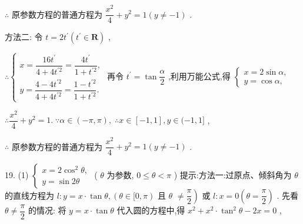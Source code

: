 $\therefore$ 原参数方程的普通方程为 $\dfrac{{x}^{2}}{4} + {y}^{2} = 1\left( {y \neq   - 1}\right)$ .

方法二: 令 $t = 2{t}^{\prime }\left( {{t}^{\prime } \in  \mathbf{R}}\right)$ ,

$\therefore \left\{  \begin{array}{l} x = \dfrac{{16}{t}^{\prime }}{4 + 4{t}^{\prime 2}} = \dfrac{4{t}^{\prime }}{1 + {t}^{\prime 2}}, \\  y = \dfrac{4 - 4{t}^{\prime 2}}{4 + 4{t}^{\prime 2}} = \dfrac{1 - {t}^{\prime 2}}{1 + {t}^{\prime 2}}. \end{array}\right.$ 再令 ${t}^{\prime } = \tan \dfrac{\alpha }{2}$ ,利用万能公式,得 $\left\{  \begin{array}{l} x = 2\sin \alpha , \\  y = \cos \alpha , \end{array}\right.$

$\therefore \dfrac{{x}^{2}}{4} + {y}^{2} = 1.\;\because \alpha  \in  \left( {-\pi ,\pi }\right) ,\;\therefore x \in  \left\lbrack  {-1,1}\right\rbrack  ,y \in  ( - 1,1\rbrack$ ,

$\therefore$ 原参数方程的普通方程为 $\dfrac{{x}^{2}}{4} + {y}^{2} = 1\left( {y \neq   - 1}\right)$ .

19. (1) $\left\{  \begin{array}{l} x = 2{\cos }^{2}\theta , \\  y = \sin {2\theta } \end{array}\right.$ ( $\theta$ 为参数, $0 \leq  \theta  < \pi$ ) 提示:方法一:过原点、倾斜角为 $\theta$ 的直线方程为 $l : y = x \cdot  \tan \theta ,(\theta  \in  \lbrack 0,\pi )$ 且 $\theta$  $\left. { \neq  \dfrac{\pi }{2}}\right)$ 或 $l : x = 0\left( {\theta  = \dfrac{\pi }{2}}\right)$ . 先看 $\theta  \neq  \dfrac{\pi }{2}$ 的情况: 将 $y = x \cdot  \tan \theta$ 代入圆的方程中,得 ${x}^{2} + {x}^{2} \cdot  {\tan }^{2}\theta  - {2x} = 0$ ,


